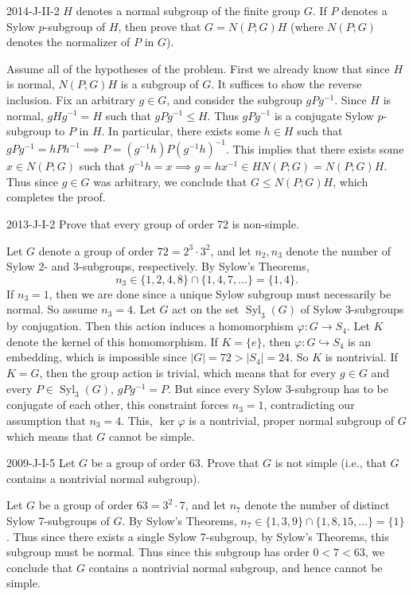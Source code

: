 \documentclass{article}
\newcommand{\embedd}{\hookrightarrow}
\begin{document}
	\begin{prb}{2014-J-II-2}
		$H$ denotes a normal subgroup of the finite group $G$. If $P$ denotes a Sylow $p$-subgroup of $H$, then prove that $G = N(P;G)H$ (where $N(P;G)$ denotes the normalizer of $P$ in $G$). 
	\end{prb}
	Assume all of the hypotheses of the problem. First we already know that since $H$ is normal, $N(P;G)H$ is a subgroup of $G$. It suffices to show the reverse inclusion. Fix an arbitrary $g \in G$, and consider the subgroup $gPg^{-1}$. Since $H$ is normal, $gHg^{-1} = H$ such that $gPg^{-1} \leq H$. Thus $gPg^{-1}$ is a conjugate Sylow $p$-subgroup to $P$ in $H$. In particular, there exists some $h \in H$ such that $gPg^{-1} = hPh^{-1} \implies P = (g^{-1}h)P(g^{-1}h)^{-1}$. This implies that there exists some $x \in N(P;G)$ such that $g^{-1}h = x \implies g = hx^{-1} \in HN(P;G) = N(P;G)H$. Thus since $g \in G$ was arbitrary, we conclude that $G \leq N(P;G)H$, which completes the proof. 
	
	
	\begin{prb}{2013-J-I-2}
		Prove that every group of order 72 is non-simple. 
	\end{prb}
	Let $G$ denote a group of order $72 = 2^{3} \cdot 3^{2}$, and let $n_{2}, n_{3}$ denote the number of Sylow 2- and 3-subgroups, respectively. By Sylow's Theorems, 
	\begin{equation*}
		n_{3} \in \{1, 2, 4, 8\} \cap \{1, 4, 7, \ldots\} = \{1, 4\}. 
	\end{equation*}
	If $n_{3} = 1$, then we are done since a unique Sylow subgroup must necessarily be normal. So assume $n_{3} = 4$. Let $G$ act on the set $\operatorname{Syl}_{3}(G)$ of Sylow 3-subgroups by conjugation. Then this action induces a homomorphism $\varphi: G \to S_{4}$. Let $K$ denote the kernel of this homomorphism. If $K = \{e\}$, then $\varphi: G \embedd S_{4}$ is an embedding, which is impossible since $|G| = 72 > |S_{4}| = 24$. So $K$ is nontrivial. If $K = G$, then the group action is trivial, which means that for every $g \in G$ and every $P \in \operatorname{Syl}_{3}(G)$, $gPg^{-1} = P$. But since every Sylow 3-subgroup has to be conjugate of each other, this constraint forces $n_{3} = 1$, contradicting our assumption that $n_{3} = 4$. This, $\ker{\varphi}$ is a nontrivial, proper normal subgroup of $G$ which means that $G$ cannot be simple. 
	
	\begin{prb}{2009-J-I-5}
		Let $G$ be a group of order 63. Prove that $G$ is not simple (i.e., that $G$ contains a nontrivial normal subgroup). 
	\end{prb}
	Let $G$ be a group of order $63 = 3^{2} \cdot 7$, and let $n_{7}$ denote the number of distinct Sylow 7-subgroups of $G$. By Sylow's Theorems, $n_{7} \in \{1, 3, 9\} \cap \{1, 8, 15, \ldots\} = \{1\}$. Thus since there exists a single Sylow 7-subgroup, by Sylow's Theorems, this subgroup must be normal. Thus since this subgroup has order $0 < 7 < 63$, we conclude that $G$ contains a nontrivial normal subgroup, and hence cannot be simple. 
	
\end{document}
